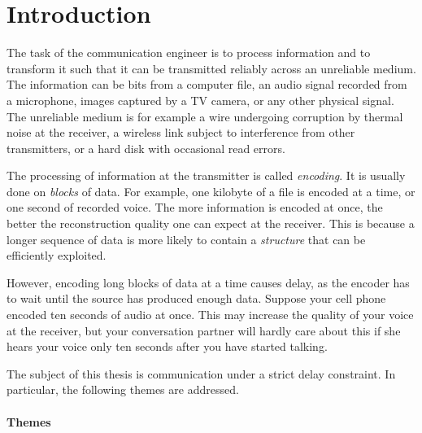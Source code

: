 \chapter*{Introduction}

The task of the communication engineer is to process information and to
transform it such that it can be transmitted reliably across an unreliable
medium. The information can be bits from a computer file, an audio signal
recorded from a microphone, images captured by a TV camera, or any other
physical signal. The unreliable medium is for example a wire undergoing
corruption by thermal noise at the receiver, a wireless link subject to
interference from other transmitters, or a hard disk with occasional read
errors.

The processing of information at the transmitter is called \emph{encoding}. It
is usually done on \emph{blocks} of data. For example, one kilobyte of a file is
encoded at a time, or one second of recorded voice. The more information is
encoded at once, the better the reconstruction quality one can expect at the
receiver. This is because a longer sequence of data is more likely to contain a
\emph{structure} that can be efficiently exploited. 

However, encoding long blocks of data at a time causes delay, as the encoder has
to wait until the source has produced enough data. Suppose your cell phone
encoded ten seconds of audio at once. This may increase the quality of your
voice at the receiver, but your conversation partner will hardly care about this
if she hears your voice only ten seconds after you have started talking.  

The subject of this thesis is communication under a strict delay constraint. In
particular, the following themes are addressed. 

\subsubsection{Themes}

